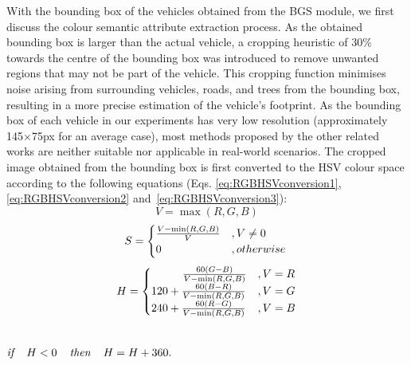 With the bounding box of the vehicles obtained from the BGS module, we first discuss the colour semantic attribute extraction process. 
As the obtained bounding box is larger than the actual vehicle, a cropping heuristic of 30\% towards the centre of the bounding box was introduced to remove unwanted regions that may not be part of the vehicle.
This cropping function minimises noise arising from surrounding vehicles, roads, and trees from the bounding box, resulting in a more precise estimation of the vehicle's footprint.
As the bounding box of each vehicle in our experiments has very low resolution (approximately 145$\times$75px for an average case), most methods proposed by the other related works are neither suitable nor applicable in real-world scenarios.
The cropped image obtained from the bounding box is first converted to the HSV colour space according to the following equations (Eqs. \ref{eq:RGBHSVconversion1}, \ref{eq:RGBHSVconversion2} and~\ref{eq:RGBHSVconversion3}): 
\begin{equation}
\label{eq:RGBHSVconversion1}
V = \max(R,G,B)
\end{equation}
\begin{equation}
\label{eq:RGBHSVconversion2}
S = \begin{cases}\frac{V - \min(R,G,B)}{V} & , V \neq 0\\
0 & , otherwise \end{cases} \\
\end{equation}
\begin{equation}
\label{eq:RGBHSVconversion3}
H = \begin{cases}
\hspace{2.8em} \frac{60(G-B)}{V-\min(R,G,B)} & ,V = R\\
120 + \frac{60(B-R)}{V-\min(R,G,B)} & ,V = G\\
240 + \frac{60(R-G)}{V-\min(R,G,B)} & ,V = B
\end{cases}
\end{equation}
\centerline{\\$\textit{if } \hspace{.8em}H< 0 \hspace{.8em}\textit{ then } \hspace{.8em}H = H+360.$}

